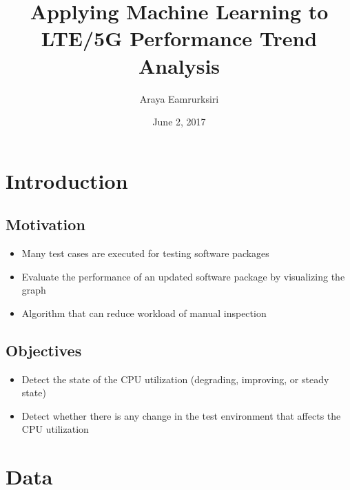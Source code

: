 \documentclass{beamer}
\title[Master Thesis]{Applying Machine Learning to LTE/5G Performance Trend Analysis} %
\author{Araya Eamrurksiri}
\institute[LiU] %
{
	Linkoping university \\ %
	\medskip
	\textit{} %
}
\date{June 2, 2017}
\begin{document}
	
	\begin{frame}
	\titlepage %
\end{frame}



\section{Introduction} 
\subsection{Motivation}
\begin{frame}

\begin{itemize}
	\item Many test cases are executed for testing software packages 
	\item Evaluate the performance of an updated software package by visualizing the graph 
	\item Algorithm that can reduce workload of manual inspection
\end{itemize}	

\end{frame}
\subsection{Objectives}
\begin{frame}
\begin{itemize}
\item Detect the state of the CPU utilization (degrading, improving, or steady state)
\item Detect whether there is any change in the test environment that affects the CPU utilization
\end{itemize}
\end{frame}

\section{Data}
\end{document}
